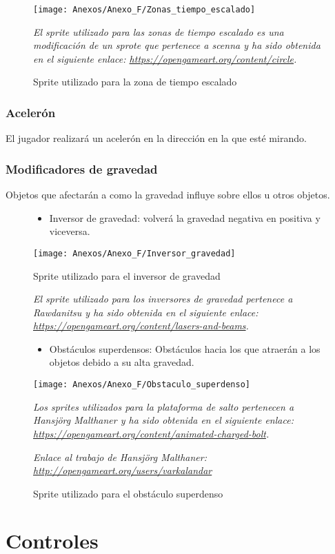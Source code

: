 \begin{figure}[h]
\centering
\texttt{[image: Anexos/Anexo\_F/Zonas\_tiempo\_escalado]}
\caption{Sprite utilizado para la zona de tiempo escalado}
\raggedright
\textit{El sprite utilizado para las zonas de tiempo escalado es una modificación de un sprote que pertenece a scenna y ha sido obtenida en el siguiente enlace: \url{https://opengameart.org/content/circle}.}
\end{figure}

\subsubsection{Acelerón}
El jugador realizará un acelerón en la dirección en la que esté mirando.

\subsubsection{Modificadores de gravedad}
Objetos que afectarán a como la gravedad influye sobre ellos u otros objetos.
\begin{figure}[h]
\begin{itemize}
\item
Inversor de gravedad: volverá la gravedad negativa en positiva y viceversa.
\end{itemize}
\centering
\texttt{[image: Anexos/Anexo\_F/Inversor\_gravedad]}
\caption{Sprite utilizado para el inversor de gravedad}
\raggedright
\textit{El sprite utilizado para los inversores de gravedad pertenece a Rawdanitsu y ha sido obtenida en el siguiente enlace: \url{https://opengameart.org/content/lasers-and-beams}.}

\begin{itemize}
\item
Obstáculos superdensos: Obstáculos hacia los que atraerán a los objetos debido a su alta gravedad.
\end{itemize}
\centering
\texttt{[image: Anexos/Anexo\_F/Obstaculo\_superdenso]}
\caption{Sprite utilizado para el obstáculo superdenso}
\raggedright
\textit{Los sprites utilizados para la plataforma de salto pertenecen a Hansjörg Malthaner y ha sido obtenida en el siguiente enlace: \url{https://opengameart.org/content/animated-charged-bolt}.}

\textit{Enlace al trabajo de Hansjörg Malthaner: \url{http://opengameart.org/users/varkalandar}}
\end{figure}

\clearpage
\section{Controles}
